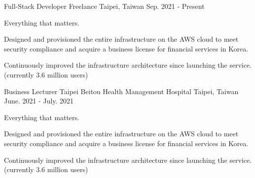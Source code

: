 

\begin{cventries}

  \cventry
    {Full-Stack Developer} %
    {Freelance} %
    {Taipei, Taiwan} %
    {Sep. 2021 - Present} %
    {
      \begin{cvitems} %
        \item {Everything that matters.}
        \item {Designed and provisioned the entire infrastructure on the AWS cloud to meet security compliance and acquire a business license for financial services in Korea.}
        \item {Continuously improved the infrastructure architecture since launching the service. (currently 3.6 million users)}
      \end{cvitems}
    }

  \cventry
  {Business Lecturer} %
  {Taipei Beitou Health Management Hospital} %
  {Taipei, Taiwan} %
  {June. 2021 - July. 2021} %
  {
    \begin{cvitems} %
      \item {Everything that matters.}
      \item {Designed and provisioned the entire infrastructure on the AWS cloud to meet security compliance and acquire a business license for financial services in Korea.}
      \item {Continuously improved the infrastructure architecture since launching the service. (currently 3.6 million users)}
    \end{cvitems}
  }


\end{cventries}
